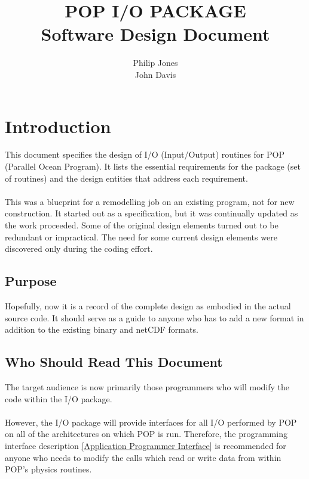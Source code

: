 \documentclass[11pt]{article}
\begin{document}
\title{POP I/O PACKAGE \\ Software Design Document}

\author{Philip Jones \\ John Davis}


\maketitle

\tableofcontents

\section{Introduction}
This document specifies the design of I/O (Input/Output) routines
for POP (Parallel Ocean Program).  It lists the essential requirements
for the package (set of routines) and the design entities that address
each requirement.

\paragraph{}
This was a blueprint for a remodelling job on an existing program,
not for new construction.  It started out as a specification, but it
was continually updated as the work proceeded.  Some of the original
design elements turned out to be redundant or impractical.  The
need for some current design elements were discovered only during
the coding effort.

\subsection{Purpose}
Hopefully, now it is a record of the complete design as embodied
in the actual source code.  It should serve as a guide to anyone
who has to add a new format in addition to the existing binary
and netCDF formats.

\subsection{Who Should Read This Document}
The target audience is now primarily those programmers who will
modify the code within the I/O package.
\paragraph{}
However, the I/O package will provide interfaces for all I/O performed
by POP on all of the architectures on which POP is run.
Therefore, the programming interface description
\ref{Application Programmer Interface} is recommended for anyone
who needs to modify the calls which read or write data from
within POP's physics routines.
\end{document}
